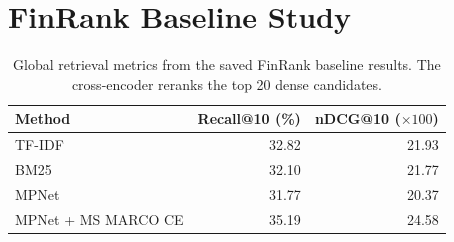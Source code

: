 \section{FinRank Baseline Study}
\label{app:finrank-baseline}


\begin{table}[t]
\centering
\small
\begin{tabular}{lrr}
\hline
Method & Recall@10 (\%) & nDCG@10 ($\times100$) \\
\hline
TF-IDF & 32.82 & 21.93 \\
BM25 & 32.10 & 21.77 \\
MPNet & 31.77 & 20.37 \\
MPNet + MS MARCO CE & 35.19 & 24.58 \\
\hline
\end{tabular}
\caption{Global retrieval metrics from the saved FinRank baseline results.
The cross-encoder reranks the top 20 dense candidates.}
\label{tab:finrank-baseline}
\end{table}

